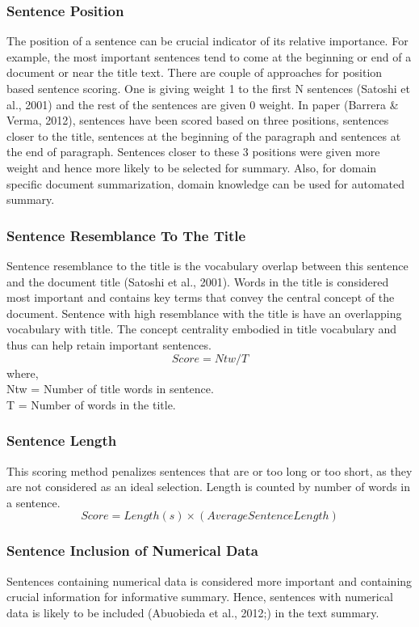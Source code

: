 \documentclass[conference]{IEEEtran}
\begin{document}
\subsubsection{Sentence Position}
The position of a sentence can be crucial indicator of its relative importance. For example, the most important sentences tend to come at the beginning or end of a document or near the title text. There are couple of approaches for position based sentence scoring. One is giving weight 1 to the first N sentences (Satoshi et al., 2001) and the rest of the sentences are given 0 weight. In paper (Barrera \& Verma, 2012), sentences have been scored based on three positions, sentences closer to the title, sentences at the beginning of the paragraph and sentences at the end of paragraph. Sentences closer to these 3 positions were given more weight and hence more likely to be selected for summary. Also, for domain specific document summarization, domain knowledge can be used for automated summary.\\
\subsubsection{Sentence Resemblance To The Title}
Sentence resemblance to the title is the vocabulary overlap between this sentence and the document title (Satoshi et al., 2001). Words in the title is considered most important and contains key terms that convey the central concept of the document. Sentence with high resemblance with the title is have an overlapping vocabulary with title. The concept centrality embodied in title vocabulary and thus can help retain important sentences.
$$
Score = Ntw/T
$$
where,\\
Ntw = Number of title words in sentence.\\
T = Number of words in the title.\\
\subsubsection{Sentence Length}
This scoring method penalizes sentences that are or too long or too short, as  they are not considered as an ideal selection. Length is counted by number of words in a sentence.
$$
Score = Length(s) \times (Average Sentence Length)
$$
\subsubsection{Sentence Inclusion of Numerical Data}
Sentences containing numerical data is considered more important and containing crucial information for informative summary. Hence, sentences with numerical data is likely to be included (Abuobieda et al., 2012;) in the text summary.\\
\end{document}
